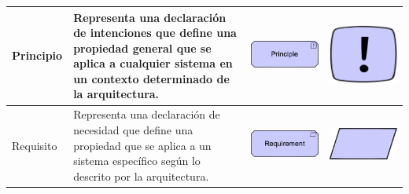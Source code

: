 \begin{longtable}{|p{0.15\linewidth}|p{0.45\linewidth}|p{0.2\linewidth} p{0.2\linewidth}|}
    Principio &
    Representa una declaración de intenciones que define una propiedad general que se aplica a cualquier sistema en un contexto determinado de la arquitectura. &
\begin{center}
    \includegraphics[width=1\linewidth]{imgs/capa_motivacional/principle1.pdf}
\end{center} &
\begin{center}
    \includegraphics[width=0.5\linewidth]{imgs/capa_motivacional/principle2.pdf}
\end{center}
    \\ \hline

    Requisito &
    Representa una declaración de necesidad que define una propiedad que se aplica a un sistema específico según lo descrito por la arquitectura. &
\begin{center}
    \includegraphics[width=1\linewidth]{imgs/capa_motivacional/requirement1.pdf}
\end{center} &
\begin{center}
    \includegraphics[width=0.5\linewidth]{imgs/capa_motivacional/requirement2.pdf}
\end{center}
    \\ \hline


\end{longtable}
